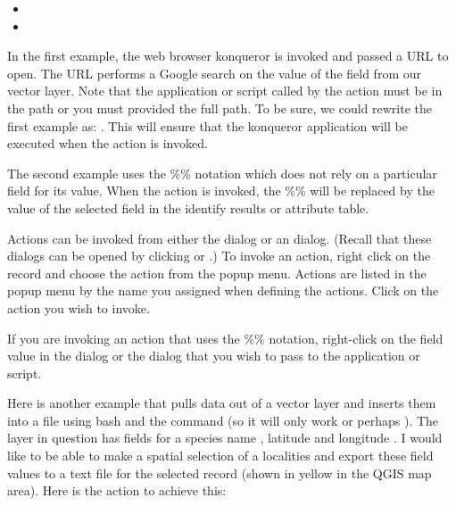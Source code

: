 \begin{itemize}
  \item {}
  \item {}
\end{itemize}

In the first example, the web browser konqueror is invoked and passed a URL to
open. The URL performs a Google search on the value of the  field
from our vector layer. Note that the application or script called by the
action must be in the path or you must provided the full path. To be sure, we could
rewrite the first example as: . This will ensure that the konqueror
application will be executed when the action is invoked.

The second example uses the \%\% notation which does not rely on a particular
field for its value. When the action is invoked, the \%\% will be replaced by
the value of the selected field in the identify results or attribute table.

\label{label_usingactions}
Actions can be invoked from either the  dialog or an
  dialog. 
(Recall that these dialogs can be opened by clicking
or
.)
To invoke an action, 
right click on the
record and choose the action from the popup menu. Actions are listed in the popup
menu by the name you assigned when defining the actions. Click on the action you
wish to invoke.

If you are invoking an action that uses the \%\% notation, right-click on the
field value in the  dialog or the
 dialog that you wish to pass to the application or script.

Here is another example that pulls data out of a vector layer and inserts them
into a file using bash and the  command (so it will only work
\nix or perhaps \osx). The layer in question has fields for a species name
, latitude  and longitude
. I would like to be able to
make a spatial selection of a localities and export these field values to a
text file for the selected record (shown in yellow in the QGIS map area). Here is
the action to achieve this:

